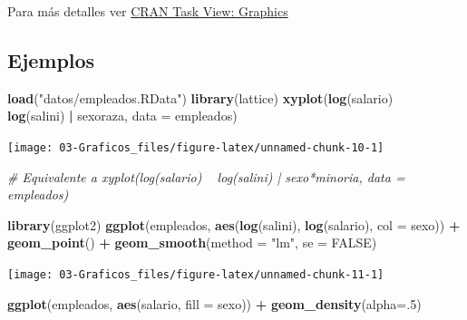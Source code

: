 \documentclass[]{book}
\newenvironment{Shaded}{\begin{snugshade}}{\end{snugshade}}
\newcommand{\KeywordTok}[1]{\textcolor[rgb]{0.13,0.29,0.53}{\textbf{#1}}}
\newcommand{\DataTypeTok}[1]{\textcolor[rgb]{0.13,0.29,0.53}{#1}}
\newcommand{\DecValTok}[1]{\textcolor[rgb]{0.00,0.00,0.81}{#1}}
\newcommand{\StringTok}[1]{\textcolor[rgb]{0.31,0.60,0.02}{#1}}
\newcommand{\CommentTok}[1]{\textcolor[rgb]{0.56,0.35,0.01}{\textit{#1}}}
\newcommand{\OtherTok}[1]{\textcolor[rgb]{0.56,0.35,0.01}{#1}}
\newcommand{\OperatorTok}[1]{\textcolor[rgb]{0.81,0.36,0.00}{\textbf{#1}}}
\newcommand{\NormalTok}[1]{#1}
\begin{document}
Para más detalles ver
\href{http://cran.r-project.org/web/views/Graphics.html}{CRAN Task View:
Graphics}

\subsection{Ejemplos}\label{ejemplos-2}

\begin{Shaded}
\begin{Highlighting}[]
\KeywordTok{load}\NormalTok{(}\StringTok{"datos/empleados.RData"}\NormalTok{)}
\KeywordTok{library}\NormalTok{(lattice)}
\KeywordTok{xyplot}\NormalTok{(}\KeywordTok{log}\NormalTok{(salario) }\OperatorTok{~}\StringTok{ }\KeywordTok{log}\NormalTok{(salini) }\OperatorTok{|}\StringTok{ }\NormalTok{sexoraza, }\DataTypeTok{data =}\NormalTok{ empleados)}
\end{Highlighting}
\end{Shaded}

\begin{center}\texttt{[image: 03-Graficos\_files/figure-latex/unnamed-chunk-10-1]} \end{center}

\begin{Shaded}
\begin{Highlighting}[]
\CommentTok{# Equivalente a xyplot(log(salario) ~ log(salini) | sexo*minoria, data = empleados)}
\end{Highlighting}
\end{Shaded}

\begin{Shaded}
\begin{Highlighting}[]
\KeywordTok{library}\NormalTok{(ggplot2)}
\KeywordTok{ggplot}\NormalTok{(empleados, }\KeywordTok{aes}\NormalTok{(}\KeywordTok{log}\NormalTok{(salini), }\KeywordTok{log}\NormalTok{(salario), }\DataTypeTok{col =}\NormalTok{ sexo)) }\OperatorTok{+}
\StringTok{  }\KeywordTok{geom_point}\NormalTok{() }\OperatorTok{+}
\StringTok{  }\KeywordTok{geom_smooth}\NormalTok{(}\DataTypeTok{method =} \StringTok{"lm"}\NormalTok{, }\DataTypeTok{se =} \OtherTok{FALSE}\NormalTok{)}
\end{Highlighting}
\end{Shaded}

\begin{center}\texttt{[image: 03-Graficos\_files/figure-latex/unnamed-chunk-11-1]} \end{center}

\begin{Shaded}
\begin{Highlighting}[]
\KeywordTok{ggplot}\NormalTok{(empleados, }\KeywordTok{aes}\NormalTok{(salario, }\DataTypeTok{fill =}\NormalTok{ sexo)) }\OperatorTok{+}
\StringTok{  }\KeywordTok{geom_density}\NormalTok{(}\DataTypeTok{alpha=}\NormalTok{.}\DecValTok{5}\NormalTok{)}
\end{Highlighting}
\end{Shaded}
\end{document}
